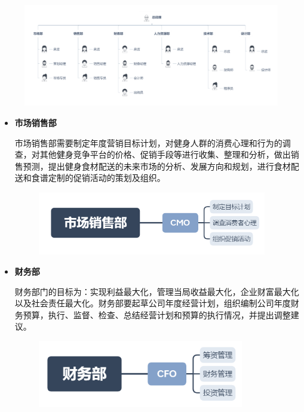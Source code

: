\documentclass[UTF8,12pt]{ctexart}
\numberwithin{figure}{section}%
\begin{document}
\begin{spacing}{2}
\begin{figure}[!htb]
	\centering
	\includegraphics[width=14cm]{fig/11}
\end{figure}

\newpage

\begin{itemize}
	
	\item \textbf{市场销售部}
	
	市场销售部需要制定年度营销目标计划，对健身人群的消费心理和行为的调查，对其他健身竞争平台的价格、促销手段等进行收集、整理和分析，做出销售预测，提出健身食材配送的未来市场的分析、发展方向和规划，进行食材配送和食谱定制的促销活动的策划及组织。

	\begin{figure}[!htb]
		\centering
		\includegraphics[width=10cm]{fig/12}
	\end{figure}
	
	 
	\item \textbf{财务部}
	
	财务部门的目标为：实现利益最大化，管理当局收益最大化，企业财富最大化以及社会责任最大化。财务部要起草公司年度经营计划，组织编制公司年度财务预算，执行、监督、检查、总结经营计划和预算的执行情况，并提出调整建议。
	\begin{figure}[!htb]
		\centering
		\includegraphics[width=9cm]{fig/13}
	\end{figure}


\end{itemize}
\end{spacing}
\end{document}
